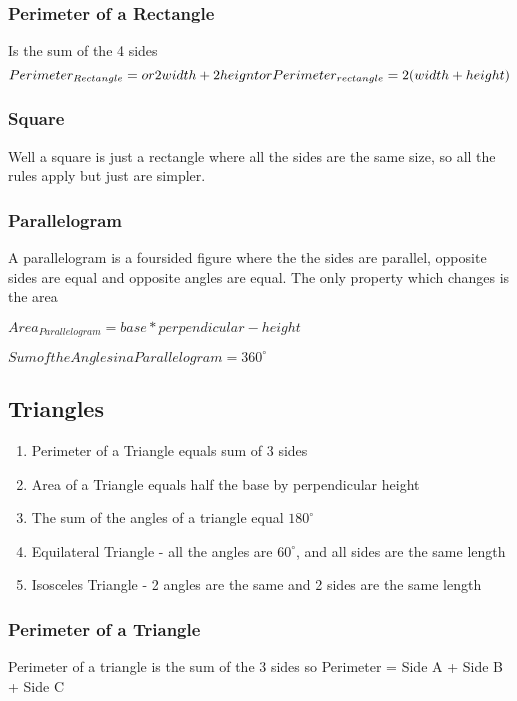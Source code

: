 \documentclass{article}
\begin{document}
\subsubsection{Perimeter of a Rectangle}
Is the sum of the 4 sides
\begin{equation}
Perimeter_{Rectangle} = or 2width + 2 heignt\\
or\\
Perimeter_{rectangle} = 2 ( width + height )
\end{equation}

\subsubsection{Square}
Well a square is just a rectangle where all the sides are the same size, so all the rules apply but just are simpler.

\subsubsection{Parallelogram}
A parallelogram is a foursided figure where the the sides are parallel, opposite sides are equal and opposite angles are equal.
The only property which changes is the area

$Area_{Parallelogram} = base * perpendicular-height$

$Sum of the Angles in a Parallelogram  = 360^{\circ}$


\newpage
\subsection{Triangles}
\begin{enumerate}
\item Perimeter of a Triangle equals sum of 3 sides
\item Area of a Triangle equals half the base by perpendicular height
\item The sum of the angles of a triangle equal $180^{\circ}$
\item Equilateral Triangle - all the angles are $60^{\circ}$, and all sides are the same length
\item Isosceles Triangle - 2 angles are the same and 2 sides are the same length
\end{enumerate}
\subsubsection{Perimeter of a Triangle}
Perimeter of a triangle is the sum of the 3 sides so
Perimeter = Side A + Side B + Side C
\end{document}
